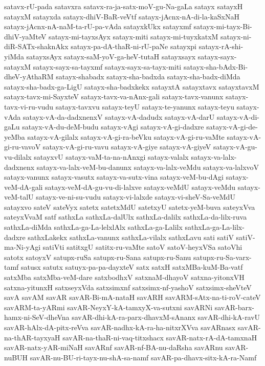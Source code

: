 {satavx-rU-pada
satavxra
satavx-ra-ja-satx-moV-gu-Na-gaLa
satayx
satayxH
satayxM
satayxda
satayx-dhiV-BaR-veVtf
satayx-jAcnx-nA-di-la-kaSxNaH
satayx-jAcnx-nA-naM-ta-rU-pa-vAda
satayxkUkx
satayxmf
satayx-mi-tayx-Bi-dhiV-yaMteV
satayx-mi-tayxsAyx
satayx-miti
satayx-mi-tuyxkatxM
satayx-ni-diR-SATx-shaknAkx
satayx-pa-dA-thaR-ni-rU-paNe
satayxpi
satayx-rA-shi-yiMda
satayxsAyx
satayx-saM-yoV-ga-heV-tutaH
satayxsayx
satayx-sayx-satayxM
satayx-sayx-sa-tayxmf
satayx-sayx-sa-tayx-miti
satayx-sha-bAdx-Bi-dheV-yAthaRM
satayx-shabadx
satayx-sha-badxda
satayx-sha-badx-diMda
satayx-sha-badx-ga-LigU
satayx-sha-badxkekx
satayxtA
satayxtavx
satayxtavxM
satayx-tavx-mi-SayxteV
satayx-tavx-va-nAnx-gali
satayx-tavx-vanunx
satayx-tavx-vi-ru-vudu
satayx-tavxvu
satayx-teyU
satayx-te-yanunx
satayx-teyu
satayx-vAda
satayx-vA-da-dadxnenxV
satayx-vA-dadudx
satayx-vA-darU
satayx-vA-di-gaLu
satayx-vA-du-deM-budu
satayx-vAgi
satayx-vA-gi-dadxre
satayx-vA-gi-de-yeMba
satayx-vA-gilalx
satayx-vA-gi-ra-beVku
satayx-vA-gi-ru-vaMte
satayx-vA-gi-ru-vavoV
satayx-vA-gi-ru-vavu
satayx-vA-giye
satayx-vA-giyeV
satayx-vA-gu-vu-dilalx
satayxvU
satayx-vaM-ta-na-nAnxgi
satayx-valalx
satayx-va-lalx-dadxnenx
satayx-va-lalx-veM-bu-danunx
satayx-va-lalx-veMdu
satayx-va-lalxvoV
satayx-vanunx
satayx-vasutx
satayx-va-sutx-vina
satayx-veM-bu-dAgi
satayx-veM-dA-gali
satayx-veM-dA-gu-vu-di-lalxve
satayx-veMdU
satayx-veMdu
satayx-veM-talU
satayx-ve-ni-su-vudu
satayx-vi-lalxde
satayx-vi-sheV-Sa-veMdU
satayxvo
sateV
sateVyx
satetx
satetxMdU
satetxyU
satetx-yeM-buva
sateyxVva
sateyxVvaM
satf
sathxLa
sathxLa-dalUlx
sathxLa-dalilx
sathxLa-da-lilx-ruva
sathxLa-diMda
sathxLa-ga-La-lelxlAlx
sathxLa-ga-Lalilx
sathxLa-ga-La-lilx-dadxre
sathxLakekx
sathxLa-vanunx
sathxLa-vilalx
sathxLavu
sati
satiV
satiV-ma-Ni-yAgi
satiVti
satitxgU
satitx-ru-vaMte
satoV
satoV-heyxVSa
satoVhi
satotx
satoyxV
satupx-ruSa
satupx-ru-Sana
satupx-ru-Sanu
satupx-ru-Sa-varx-tamf
satusx
satutx
satuyx-pa-pa-dayxteV
satx
satxH
satxMBa-kuM-Ba-vatf
satxMba
satxMba-veM-dare
satxbodhxV
satxnaM-dhayoV
satxna-yitonxVH
satxna-yitunxH
satxseyxVda
satxsimxnf
satxsimx-nf-yashoV
satxsimx-sheVteV
savA
savAM
savAR
savAR-Bi-mA-nataH
savARH
savARM-sAtx-na-ti-roV-cateV
savARM-ta-yARmi
savAR-NeyxY-kA-tamxyX-va-sutxni
savARNi
savAR-barx-hamx-ni-SeV-dheVna
savAR-dhi-kA-ra-parx-dhavxM-sAnanx
savAR-dhi-kA-ravU
savAR-hAlx-dA-pitx-reVva
savAR-nadhx-kA-ra-ha-nitxrXVva
savARnasx
savAR-na-thAR-tayxyaH
savAR-na-thaR-ni-vaq-titxshacx
savAR-natx-rA-dA-tamxnaH
savAR-natx-yAR-miNaH
savARnf
savAR-nf-BA-nu-daRsha
savARnu
savAR-nuBUH
savAR-nu-BU-ri-tayx-nu-shA-sa-namf
savAR-pa-dhavx-sitx-kA-ra-Namf
}
